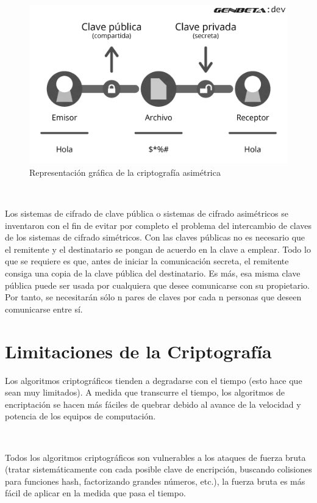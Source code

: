 \documentclass[11pt, conference]{IEEEtran}
\begin{document}
\begin{figure}[h]
	\begin{center}
		\includegraphics[scale=0.35]{moderno.png}
		\caption{Representación gráfica de la criptografía asimétrica} 
	\end{center}
\end{figure}

\

Los sistemas de cifrado de clave pública o sistemas de cifrado asimétricos se inventaron con el fin de evitar por completo el problema del intercambio de claves de los sistemas de cifrado simétricos. Con las claves públicas no es necesario que el remitente y el destinatario se pongan de acuerdo en la clave a emplear. Todo lo que se requiere es que, antes de iniciar la comunicación secreta, el remitente consiga una copia de la clave pública del destinatario. Es más, esa misma clave pública puede ser usada por cualquiera que desee comunicarse con su propietario. Por tanto, se necesitarán sólo n pares de claves por cada n personas que deseen comunicarse entre sí.

\section{Limitaciones de la Criptografía}


Los algoritmos criptográficos tienden a degradarse con el tiempo (esto hace que sean muy limitados). A medida que transcurre el tiempo, los algoritmos de encriptación se hacen más fáciles de quebrar debido al avance de la velocidad y potencia de los equipos de computación. 

\

Todos los algoritmos criptográficos son vulnerables a los ataques de fuerza bruta (tratar sistemáticamente con cada posible clave de encripción, buscando colisiones para funciones hash, factorizando grandes números, etc.), la fuerza bruta es más fácil de aplicar en la medida que pasa el tiempo.
\end{document}
